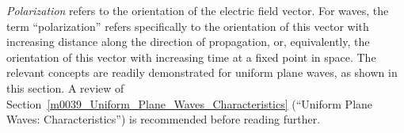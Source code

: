 

\label{m0131_Wave_Polarization} %

\emph{Polarization} refers to the orientation of the electric field vector.
For waves, the term ``polarization'' refers specifically to the orientation of this vector with increasing distance along the direction of propagation, or, equivalently, the orientation of this vector with increasing time at a fixed point in space.
The relevant concepts are readily demonstrated for uniform plane waves, as shown in this section.
A review of Section~\ref{m0039_Uniform_Plane_Waves_Characteristics} (``Uniform Plane Waves: Characteristics'') is recommended before reading further.

